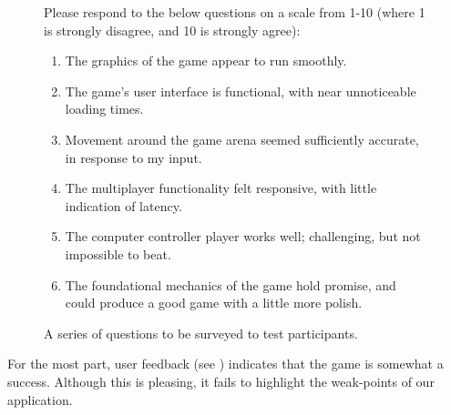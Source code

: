 \documentclass{standalone}
\begin{document}
		\begin{figure}
			\begin{formal}
				Please respond to the below questions on a scale from 1-10 (where 1 is strongly disagree, and 10 is strongly agree):
				\begin{enumerate}
					\item The graphics of the game appear to run smoothly.
					\item The game's user interface is functional, with near unnoticeable loading times. 
					\item Movement around the game arena seemed sufficiently accurate, in response to my input.
					\item The multiplayer functionality felt responsive, with little indication of latency.
					\item The computer controller player works well; challenging, but not impossible to beat.
					\item The foundational mechanics of the game hold promise, and could produce a good game with a little more polish.
				\end{enumerate}
				\caption{A series of questions to be surveyed to test participants.} \label{fig:userSurvey}
			\end{formal}
		\end{figure}

		For the most part, user feedback (see ) indicates that the game is somewhat a success. Although this is pleasing, it fails to highlight the weak-points of our application.
\end{document}

